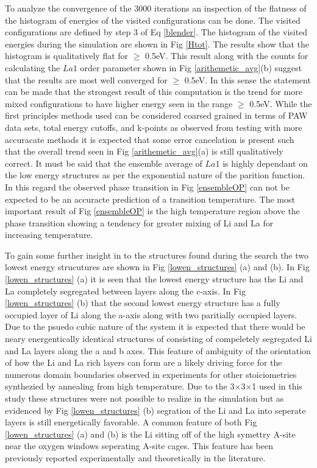 \documentclass[aps,prl,reprint,superscriptaddress,showkeys]{revtex4-1}
\begin{document}
To analyze the convergence of the 3000 iterations an inspection of the flatness of the histogram of energies of the visited configurations can be done. The visited configurations are defined by step 3 of Eq \ref{blender}. The histogram of the visited energies during the simulation are shown in Fig \ref{Htot}. The results show that  the histogram is qualitatively flat for $\ge$ 0.5eV. This result along with the counts for calculating the $La1$ order parameter shown in Fig \ref{arithemetic_avg}(b) suggest that the results are most well converged for $\ge$ 0.5eV. In this sense the statement can be made that the strongest result of this computation is the trend for more mixed configurations to have higher energy seen in the range $\ge$ 0.5eV. While the first principles methods used can be considered coarsed grained in terms of PAW data sets, total energy cutoffs, and k-points as observed from testing with more accuracate methods it is expected that some error cancelation is present such that the overall trend seen in Fig \ref{arithemetic_avg}(a) is still qualitatively correct. It must be said that the ensemble average of $La1$ is highly dependant on the low energy structures as per the exponential nature of the parition function. In this regard the observed phase transition in Fig \ref{ensembleOP} can not be expected to be an accuracte prediction of a transition temperature. The most important result of Fig \ref{ensembleOP} is the high temperature region above the phase transition showing a tendency for greater mixing of Li and La for increasing temperature. 

To gain some further insight in to the structures found during the search the two lowest energy strucutures are  shown in  Fig \ref{lowen_structures} (a) and (b). In Fig \ref{lowen_structures} (a) it is seen that the lowest energy structure has the Li and La completely segregated between layers along the c-axis. In Fig  \ref{lowen_structures} (b) that the second lowest energy structure has a fully occupied layer of Li along the a-axis along with two paritially occupied layers.  Due to the psuedo cubic nature of the system it is expected that there would be neary energentically identical structures of consisting of compeletely segregated Li and La layers along the a and b axes. This feature of ambiguity of the orientation of how the Li and La rich layers can form  are a likely driving force for the numerous domain boundaries observed in experiments for other stoiciometries synthezied by annealing from high temperature.   Due to the 3$\times$3$\times$1 used in this study these structures were not possible to realize in the simulation but as evidenced by Fig  \ref{lowen_structures} (b) segration of the Li and La into seperate layers is still energetically favorable. A common feature of both Fig \ref{lowen_structures} (a) and (b) is the Li sitting off of the high symettry A-site near the oxygen windows seperating A-site cages. This feature has been previously reported experimentally and theoretically in the literature\cite{Asitedistribution,imaginary_phonons,Li_La_ordering_computational}. 
\end{document}
